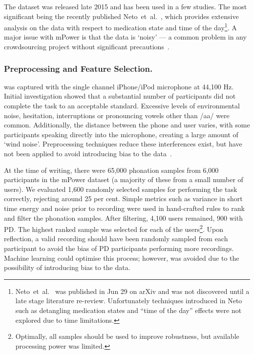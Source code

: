 \documentclass[12pt, twoside]{book}
\renewcommand\emph[1]{\textit{\color{USred}{#1}}}
\begin{document}
The dataset was released late 2015 and has been used in a few studies. The most significant being the recently published Neto~et~al.~\cite{mpowerneto2017analysis}, which provides extensive analysis on the data with respect to medication state and time of the day\footnote{Neto~et~al.~\cite{mpowerneto2017analysis} was published in Jun 29 on arXiv and was not discovered until a late stage literature re-review. Unfortunately techniques introduced in Neto such as detangling medication states and ``time of the day'' effects were not explored due to time limitations.}. A major issue with mPower is that the data is `noisy' --- a common problem in any crowdsourcing project without significant precautions~\cite{crowdsourcing}. 


\subsubsection{Preprocessing and Feature Selection.}
\label{mpowerprocess}
\emph{Vowel phonation} was captured with the single channel iPhone/iPod microphone at 44,100 Hz. Initial investigation showed that a substantial number of participants did not complete the task to an acceptable standard. Excessive levels of environmental noise, hesitation, interruptions or pronouncing vowels other than /aa/ were common. Additionally, the distance between the phone and user varies, with some participants speaking directly into the microphone, creating a large amount of `wind noise'. Preprocessing techniques reduce these interferences exist, but have not been applied to avoid introducing bias to the data~\cite{wang2007speechenhancement, orozco2015voiced,	windnoise}. 


At the time of writing, there were 65,000 phonation samples from 6,000 participants in the mPower dataset (a majority of these from a small number of users). We evaluated 1,600 randomly selected samples for performing the task correctly, rejecting around 25 per cent. Simple metrics such as variance in short time energy and noise prior to recording were used in hand-crafted rules to rank and filter the phonation samples. After filtering, 4,100 users remained, 900 with PD. The highest ranked sample was selected for each of the users\footnote{Optimally, all samples should be used to improve robustness, but available processing power was limited.}. Upon reflection, a valid recording should have been randomly sampled from each participant to avoid the bias of PD participants performing more recordings. Machine learning could optimise this process; however, was avoided due to the possibility of introducing bias to the data. 
\end{document}
